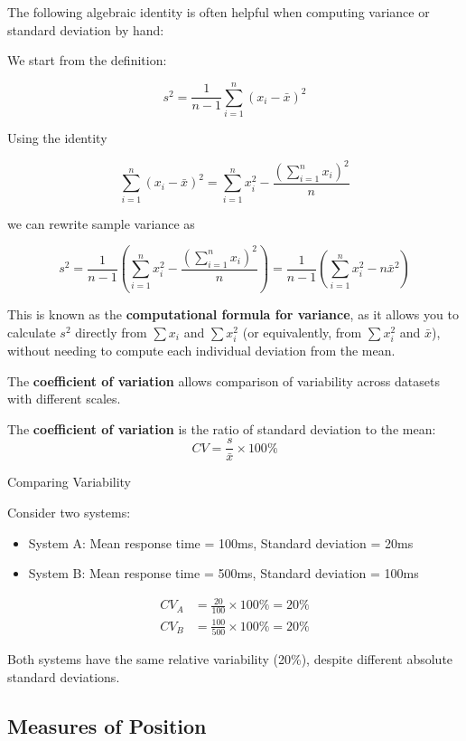 The following algebraic identity is often helpful when computing variance or standard deviation by hand:

We start from the definition:

\[
s^2 = \frac{1}{n-1}\sum_{i=1}^n (x_i - \bar{x})^2
\]

Using the identity

\[
\sum_{i=1}^n (x_i - \bar{x})^2 = \sum_{i=1}^n x_i^2 - \frac{\left(\sum_{i=1}^n x_i \right)^2}{n}
\]

we can rewrite sample variance as

\[
s^2 = \frac{1}{n-1} \left( \sum_{i=1}^n x_i^2 - \frac{\left(\sum_{i=1}^n x_i\right)^2}{n} \right) =\frac{1}{n-1}\left(\sum_{i=1}^n x_i^2-n \bar{x}^2\right)
\]

This is known as the \textbf{computational formula for variance}, as it allows you to calculate $s^2$ directly from $\sum x_i$ and $\sum x_i^2$ (or equivalently, from $\sum x_i^2$ and $\bar{x}$), without needing to compute each individual deviation from the mean.


The \textbf{coefficient of variation} allows comparison of variability across datasets with different scales.

\begin{definition}
The \textbf{coefficient of variation} is the ratio of standard deviation to the mean:
\[
CV = \frac{s}{\bar{x}} \times 100\%
\]
\end{definition}

\begin{example} Comparing Variability

Consider two systems:
\begin{itemize}
    \item System A: Mean response time = 100ms, Standard deviation = 20ms
    \item System B: Mean response time = 500ms, Standard deviation = 100ms
\end{itemize}

\begin{align*}
CV_A &= \frac{20}{100} \times 100\% = 20\% \\
CV_B &= \frac{100}{500} \times 100\% = 20\%
\end{align*}

Both systems have the same relative variability (20\%), despite different absolute standard deviations.
\end{example}

\subsection*{Measures of Position}

